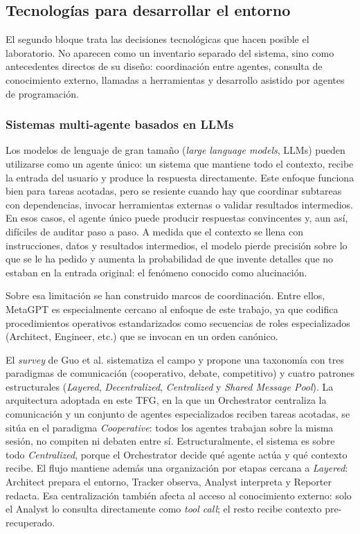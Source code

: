 \subsection{Tecnologías para desarrollar el entorno}

El segundo bloque trata las decisiones tecnológicas que hacen posible el
laboratorio. No aparecen como un inventario separado del sistema, sino como
antecedentes directos de su diseño: coordinación entre agentes, consulta de
conocimiento externo, llamadas a herramientas y desarrollo asistido por agentes
de programación.

\subsubsection{Sistemas multi-agente basados en LLMs}

Los modelos de lenguaje de gran tamaño (\textit{large language models}, LLMs)
pueden utilizarse como un agente único: un sistema que mantiene todo el
contexto, recibe la entrada del usuario y produce la respuesta directamente.
Este enfoque funciona bien para tareas
acotadas, pero se resiente cuando hay que coordinar subtareas con
dependencias, invocar herramientas externas o validar resultados
intermedios. En esos casos, el agente único puede producir respuestas
convincentes y, aun así, difíciles de auditar paso a paso. A medida que
el contexto se llena con instrucciones, datos y resultados intermedios,
el modelo pierde precisión sobre lo que se le ha pedido y aumenta la
probabilidad de que invente detalles que no estaban en la entrada
original: el fenómeno conocido como alucinación.

Sobre esa limitación se han construido marcos de coordinación. Entre ellos,
MetaGPT \cite{hong2024metagpt} es especialmente cercano al enfoque de este
trabajo, ya que codifica procedimientos operativos estandarizados como
secuencias de roles especializados (Architect, Engineer, etc.) que se
invocan en un orden canónico.

El \textit{survey} de Guo et al. \cite{guo2024llmbased} sistematiza el
campo y propone una taxonomía con tres paradigmas de comunicación
(cooperativo, debate, competitivo) y cuatro patrones estructurales
(\textit{Layered}, \textit{Decentralized}, \textit{Centralized} y
\textit{Shared Message Pool}). La arquitectura adoptada en este TFG, en
la que un Orchestrator centraliza la comunicación y un conjunto de agentes
especializados reciben tareas acotadas, se sitúa en el paradigma
\textit{Cooperative}: todos los agentes trabajan sobre la misma sesión, no
compiten ni debaten entre sí. Estructuralmente, el sistema es sobre todo
\textit{Centralized}, porque el Orchestrator decide qué agente actúa y qué
contexto recibe. El flujo mantiene además una organización por etapas cercana a
\textit{Layered}: Architect prepara el entorno, Tracker observa, Analyst
interpreta y Reporter redacta. Esa centralización también afecta al acceso al
conocimiento externo: solo el Analyst lo consulta directamente como
\textit{tool call}; el resto recibe contexto pre-recuperado.

